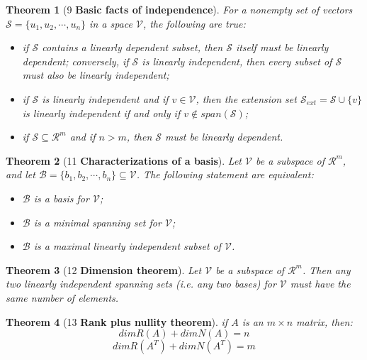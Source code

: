 \documentclass[10.5pt]{article}
\newtheorem{theo}{Theorem}
\begin{document}
\begin{theo}[9 \textbf{Basic facts of independence}]
For a nonempty set of vectors $\mathcal{S} = \{u_1, u_2,\cdots , u_n\}$ in a space $\mathcal{V}$, the following are true:
\begin{itemize}
\item if $\mathcal{S}$ contains a linearly dependent subset, then $\mathcal{S}$ itself must be linearly dependent; conversely, if $\mathcal{S}$ is linearly independent, then every subset of $\mathcal{S}$ must also be linearly independent;
\item if $\mathcal{S}$ is linearly independent and if $v \in \mathcal{V}$, then the extension set $\mathcal{S}_{ext}=\mathcal{S} \cup \{v\}$ is linearly independent if and only if $v \notin span(\mathcal{S})$;
\item if $\mathcal{S}  \subseteq \mathcal{R}^m$ and if $n > m$, then $\mathcal{S}$ must be linearly dependent.
\end{itemize}
\end{theo}
\begin{theo}[11 \textbf{Characterizations of a basis}]
Let $\mathcal{V}$ be a subspace of $\mathcal{R}^m$, and let $\mathcal{B}=\{b_1,b_2,\cdots ,b_n \}\subseteq \mathcal{V}$. The following statement are equivalent:
\begin{itemize}
\item $\mathcal{B}$ is a basis for $\mathcal{V}$;
\item $\mathcal{B}$ is a minimal spanning set for $\mathcal{V}$;
\item $\mathcal{B}$ is a maximal linearly independent subset of $\mathcal{V}$.
\end{itemize}
\end{theo}
\begin{theo}[12 \textbf{Dimension theorem}]
Let $\mathcal{V}$ be a subspace of $\mathcal{R}^m$. Then any two linearly independent spanning sets (i.e. any two bases) for $\mathcal{V}$ must have the same number of elements.
\end{theo}

\begin{theo}[13 \textbf{Rank plus nullity theorem}]
if $A$ is an $m\times n$ matrix, then:
$$dimR(A)+dimN(A)=n$$
$$dimR(A^T)+dimN(A^T)=m$$
\end{theo}
\end{document}
